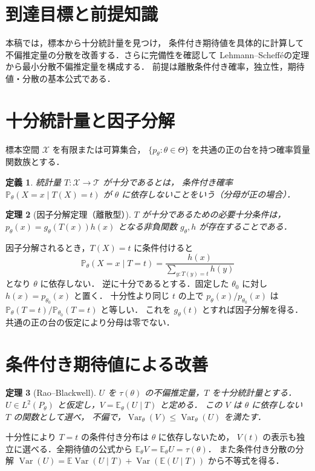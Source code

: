 \documentclass[a5paper,10pt,onecolumn]{jsarticle}
\makeatletter
\theoremstyle{mathnotetheorem}
\newtheorem{theorem}{定理}[section]
\newtheorem{definition}[theorem]{定義}
\renewcommand{\proofname}{証明}
\renewenvironment{proof}[1][\proofname]{%
  \par\pushQED{\qed}\normalfont\topsep4\p@\@plus2\p@\relax
  \trivlist\item[\hskip\labelsep\bfseries #1]\ignorespaces
}{\popQED\endtrivlist\@endpefalse}
\makeatother
\begin{document}
\section*{到達目標と前提知識}
本稿では，標本から十分統計量を見つけ，
条件付き期待値を具体的に計算して
不偏推定量の分散を改善する．さらに完備性を確認して
Lehmann--Scheff\'eの定理から最小分散不偏推定量を構成する．
前提は離散条件付き確率，独立性，期待値・分散の基本公式である．

\section{十分統計量と因子分解}
標本空間 $\mathcal X$ を有限または可算集合，
$\{p_\theta:\theta\in\Theta\}$ を共通の正の台を持つ確率質量関数族とする．
\begin{definition}
統計量 $T:\mathcal X\to\mathcal T$ が十分であるとは，
条件付き確率 $\mathbb P_\theta(X=x\mid T(X)=t)$ が
$\theta$ に依存しないことをいう（分母が正の場合）．
\end{definition}
\begin{theorem}[因子分解定理（離散型）]
$T$ が十分であるための必要十分条件は，
$p_\theta(x)=g_\theta(T(x))h(x)$ となる非負関数 $g_\theta,h$ が存在することである．
\end{theorem}
\begin{proof}
因子分解されるとき，$T(X)=t$ に条件付けると
\[
 \mathbb P_\theta(X=x\mid T=t)
 =\frac{h(x)}{\sum_{y:T(y)=t}h(y)}
\]
となり $\theta$ に依存しない．
逆に十分であるとする．固定した $\theta_0$ に対し $h(x)=p_{\theta_0}(x)$ と置く．
十分性より同じ $t$ の上で $p_\theta(x)/p_{\theta_0}(x)$ は
$\mathbb P_\theta(T=t)/\mathbb P_{\theta_0}(T=t)$ と等しい．
これを $g_\theta(t)$ とすれば因子分解を得る．
共通の正の台の仮定により分母は零でない．
\end{proof}
\section{条件付き期待値による改善}
\begin{theorem}[Rao--Blackwell]
$U$ を $\tau(\theta)$ の不偏推定量，$T$ を十分統計量とする．
$U\in L^2(P_\theta)$ と仮定し，$V=\mathbb E_\theta(U\mid T)$ と定める．
この $V$ は $\theta$ に依存しない $T$ の関数として選べ，
不偏で，$\operatorname{Var}_\theta(V)\le\operatorname{Var}_\theta(U)$ を満たす．
\end{theorem}
\begin{proof}
十分性により $T=t$ の条件付き分布は $\theta$ に依存しないため，
$V(t)$ の表示も独立に選べる．全期待値の公式から
$\mathbb E_\theta V=\mathbb E_\theta U=\tau(\theta)$．
また条件付き分散の分解
$\operatorname{Var}(U)=\mathbb E\operatorname{Var}(U\mid T)+
\operatorname{Var}(\mathbb E(U\mid T))$ から不等式を得る．
\end{proof}
\end{document}
